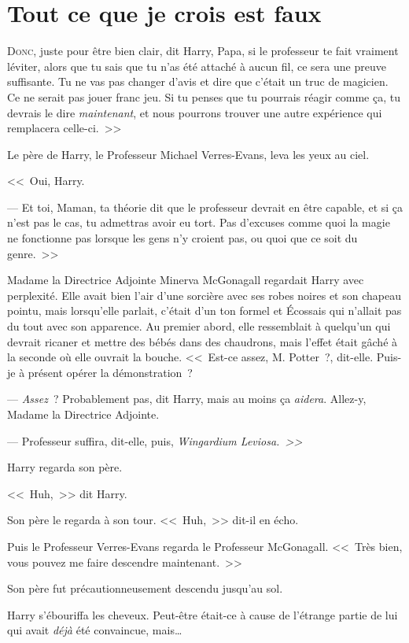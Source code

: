 \chapter{Tout ce que je crois est faux}

\lettrine[ante=<<~]{D}{onc}, juste pour être bien clair, dit Harry, Papa, si le professeur te fait vraiment léviter, alors que tu sais que tu n'as été attaché à aucun fil, ce sera une preuve suffisante. Tu ne vas pas changer d'avis et dire que c'était un truc de magicien. Ce ne serait pas jouer franc jeu. Si tu penses que tu pourrais réagir comme ça, tu devrais le dire \emph{maintenant}, et nous pourrons trouver une autre expérience qui remplacera celle-ci.~>>

Le père de Harry, le Professeur Michael Verres-Evans, leva les yeux au ciel.

<<~Oui, Harry.

--- Et toi, Maman, ta théorie dit que le professeur devrait en être capable, et si ça n'est pas le cas, tu admettras avoir eu tort. Pas d'excuses comme quoi la magie ne fonctionne pas lorsque les gens n'y croient pas, ou quoi que ce soit du genre.~>>

Madame la Directrice Adjointe Minerva McGonagall regardait Harry avec perplexité. Elle avait bien l'air d'une sorcière avec ses robes noires et son chapeau pointu, mais lorsqu'elle parlait, c'était d'un ton formel et Écossais qui n'allait pas du tout avec son apparence. Au premier abord, elle ressemblait à quelqu'un qui devrait ricaner et mettre des bébés dans des chaudrons, mais l'effet était gâché à la seconde où elle ouvrait la bouche. <<~Est-ce assez, M. Potter~?, dit-elle. Puis-je à présent opérer la démonstration~?

--- \emph{Assez}~? Probablement pas, dit Harry, mais au moins ça \emph{aidera}. Allez-y, Madame la Directrice Adjointe.

--- Professeur suffira, dit-elle, puis, \emph{Wingardium Leviosa.~>>}

Harry regarda son père.

<<~Huh,~>> dit Harry.

Son père le regarda à son tour. <<~Huh,~>> dit-il en écho.

Puis le Professeur Verres-Evans regarda le Professeur McGonagall. <<~Très bien, vous pouvez me faire descendre maintenant.~>>

Son père fut précautionneusement descendu jusqu'au sol.

Harry s'ébouriffa les cheveux. Peut-être était-ce à cause de l'étrange partie de lui qui avait \emph{déjà} été convaincue, mais…

